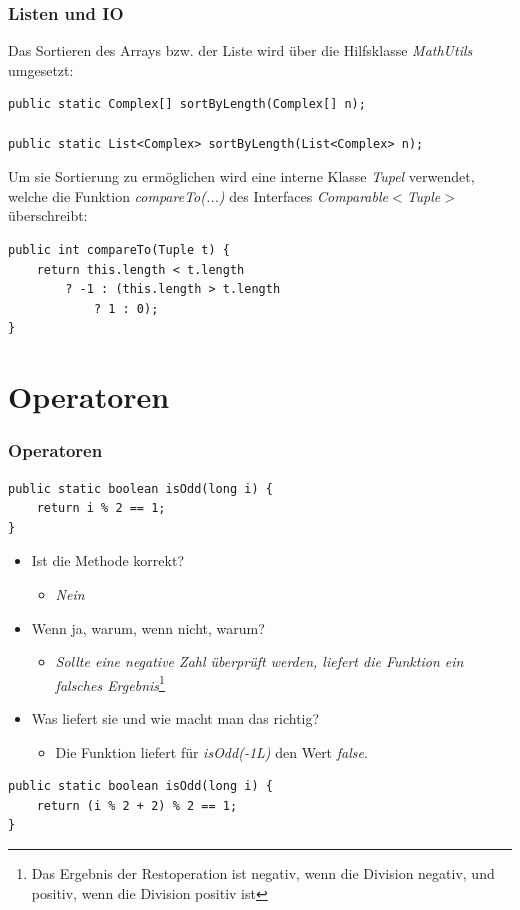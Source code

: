 \documentclass{beamer}
\begin{document}
\begin{frame}[fragile]
\frametitle{Listen und IO}

Das Sortieren des Arrays bzw. der Liste wird \"uber die Hilfsklasse \textit{MathUtils} umgesetzt:

\begin{lstlisting}
public static Complex[] sortByLength(Complex[] n);

public static List<Complex> sortByLength(List<Complex> n);
\end{lstlisting}

Um sie Sortierung zu erm\"oglichen wird eine interne Klasse \textit{Tupel} verwendet, welche die Funktion \textit{compareTo(...)} des
Interfaces \textit{Comparable$<$Tuple$>$} \"uberschreibt:

\begin{lstlisting}
public int compareTo(Tuple t) {
	return this.length < t.length 
		? -1 : (this.length > t.length 
			? 1 : 0);
}
\end{lstlisting}

\end{frame}

\section{Operatoren}
\begin{frame}[fragile]
\frametitle{Operatoren}

\begin{lstlisting}
public static boolean isOdd(long i) {
	return i % 2 == 1;
}
\end{lstlisting}

\begin{itemize}
\item Ist die Methode korrekt?
	\begin{itemize}
	\item \textit{ Nein}
	\end{itemize}
\item Wenn ja, warum, wenn nicht, warum?
	\begin{itemize}
	\item \textit{Sollte eine negative Zahl \"uberpr\"uft werden, liefert die Funktion ein falsches Ergebnis}\footnote{Das Ergebnis der Restoperation ist negativ, wenn die Division negativ, und positiv, wenn die Division positiv ist}
	\end{itemize}
\item Was liefert sie und wie macht man das richtig?
	\begin{itemize}
	\item Die Funktion liefert f\"ur \textit{isOdd(-1L)} den Wert \textit{false}.
	\end{itemize}
\end{itemize}

\begin{lstlisting}
public static boolean isOdd(long i) {
	return (i % 2 + 2) % 2 == 1;
}
\end{lstlisting}

\end{frame}
\end{document}
